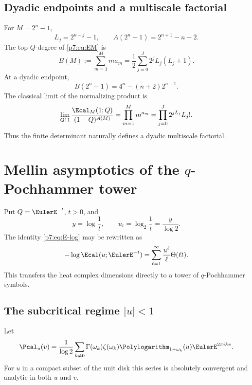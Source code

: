 \documentclass[11pt]{article}
\numberwithin{equation}{section}
\theoremstyle{definition}
\theoremstyle{remark}
\begin{document}
\subsection{Dyadic endpoints and a multiscale factorial}

For $M=2^n-1$,
\begin{equation}\label{p7:eq:dyadic-L}
 L_j=2^{n-j}-1,
 \qquad
 A(2^n-1)=2^{n+1}-n-2.
\end{equation}
The top $Q$-degree of \cref{p7:eq:EM} is
\begin{equation}\label{p7:eq:B-M}
 B(M):=\sum_{m=1}^{M}ma_m
 =\frac12\sum_{j=0}^{J}2^jL_j(L_j+1).
\end{equation}
At a dyadic endpoint,
\begin{equation}\label{p7:eq:B-dyadic}
 B(2^n-1)=4^n-(n+2)2^{n-1}.
\end{equation}
The classical limit of the normalizing product is
\begin{equation}\label{p7:eq:multiscale-factorial}
 \lim_{Q\uparrow1}\frac{\Ecal_M(1;Q)}{(1-Q)^{A(M)}}
 =\prod_{m=1}^{M}m^{a_m}
 =\prod_{j=0}^{J}2^{jL_j}L_j!.
\end{equation}
Thus the finite determinant naturally defines a dyadic multiscale factorial.

\section{Mellin asymptotics of the $q$-Pochhammer tower}

Put $Q=\EulerE^{-t}$, $t>0$, and
\[
 y=\log\frac1t,
 \qquad
 u_t=\log_2\frac1t=\frac y{\log2}.
\]
The identity \cref{p7:eq:E-log} may be rewritten as
\begin{equation}\label{p7:eq:E-Theta}
 -\log\Ecal(u;\EulerE^{-t})
 =\sum_{\ell=1}^{\infty}\frac{u^\ell}{\ell}\Theta(\ell t).
\end{equation}
This transfers the heat complex dimensions directly to a tower of $q$-Pochhammer symbols.

\subsection{The subcritical regime $|u|<1$}

Let
\begin{equation}\label{p7:eq:Pu}
 \Pcal_u(v)=\frac1{\log2}
 \sum_{k\ne0}\Gamma(\omega_k)\zeta(\omega_k)
 \Polylogarithm_{1+\omega_k}(u)\EulerE^{2\pi ikv}.
\end{equation}
For $u$ in a compact subset of the unit disk this series is absolutely convergent and analytic in both $u$ and $v$.
\end{document}
